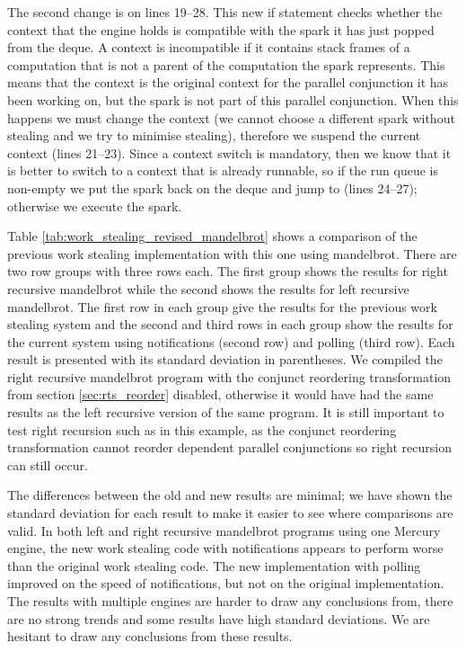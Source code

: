 The second change is on lines 19--28.
This new if statement checks whether the context that the engine holds is
compatible with the spark it has just popped from the deque.
A context is incompatible if it contains stack frames of a computation that
is not a parent of the computation the spark represents.
This means that the context is the original context for the parallel
conjunction it has been working on,
but the spark is not part of this parallel conjunction.
When this happens we must change the context
(we cannot choose a different spark without stealing and we try to minimise
stealing),
therefore we suspend the current context (lines 21--23).
Since a context switch is mandatory, then we know that it is better to
switch to a context that is already runnable,
so if the run queue is non-empty we put the spark back on the deque and jump
to \idle (lines 24--27);
otherwise we execute the spark.



Table \ref{tab:work_stealing_revised_mandelbrot} shows a comparison of the previous
work stealing implementation with this one using mandelbrot.
There are two row groups with three rows each.
The first group shows the results for right recursive mandelbrot while the
second shows the results for left recursive mandelbrot.
The first row in each group give the results for the previous work stealing
system and
the second and third rows in each group show the results for the current
system using notifications (second row) and polling (third row).
Each result is presented with its standard deviation in parentheses.
We compiled the right recursive mandelbrot program with the conjunct
reordering transformation from section \ref{sec:rts_reorder} disabled,
otherwise it would have had the same results as the left recursive version
of the same program.
It is still important to test right recursion such as in this example,
as the conjunct reordering transformation cannot reorder dependent parallel
conjunctions so right recursion can still occur.

The differences between the old and new results are minimal;
we have shown the standard deviation for each result to make it easier to
see where comparisons are valid.
In both left and right recursive mandelbrot programs using one Mercury
engine,
the new work stealing code with notifications appears to perform worse than
the original work stealing code.
The new implementation with polling improved on the speed of notifications,
but not on the original implementation.
The results with multiple engines are harder to draw any conclusions from,
there are no strong trends and some results have high standard deviations.
We are hesitant to draw any conclusions from these results.

